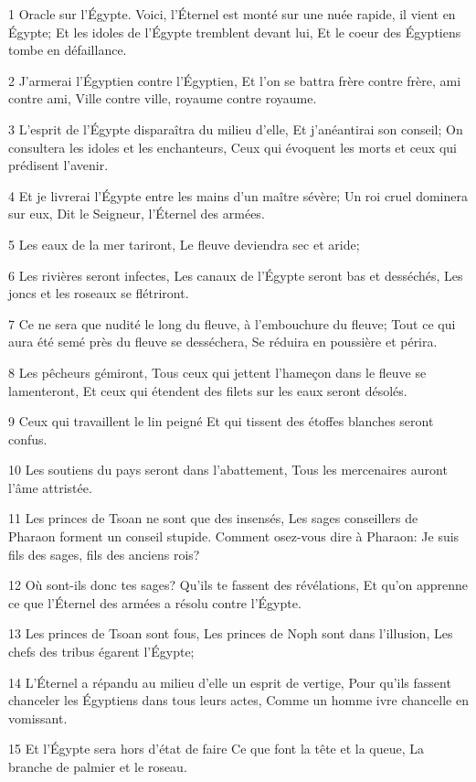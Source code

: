 \par 1 Oracle sur l'Égypte. Voici, l'Éternel est monté sur une nuée rapide, il vient en Égypte; Et les idoles de l'Égypte tremblent devant lui, Et le coeur des Égyptiens tombe en défaillance.
\par 2 J'armerai l'Égyptien contre l'Égyptien, Et l'on se battra frère contre frère, ami contre ami, Ville contre ville, royaume contre royaume.
\par 3 L'esprit de l'Égypte disparaîtra du milieu d'elle, Et j'anéantirai son conseil; On consultera les idoles et les enchanteurs, Ceux qui évoquent les morts et ceux qui prédisent l'avenir.
\par 4 Et je livrerai l'Égypte entre les mains d'un maître sévère; Un roi cruel dominera sur eux, Dit le Seigneur, l'Éternel des armées.
\par 5 Les eaux de la mer tariront, Le fleuve deviendra sec et aride;
\par 6 Les rivières seront infectes, Les canaux de l'Égypte seront bas et desséchés, Les joncs et les roseaux se flétriront.
\par 7 Ce ne sera que nudité le long du fleuve, à l'embouchure du fleuve; Tout ce qui aura été semé près du fleuve se desséchera, Se réduira en poussière et périra.
\par 8 Les pêcheurs gémiront, Tous ceux qui jettent l'hameçon dans le fleuve se lamenteront, Et ceux qui étendent des filets sur les eaux seront désolés.
\par 9 Ceux qui travaillent le lin peigné Et qui tissent des étoffes blanches seront confus.
\par 10 Les soutiens du pays seront dans l'abattement, Tous les mercenaires auront l'âme attristée.
\par 11 Les princes de Tsoan ne sont que des insensés, Les sages conseillers de Pharaon forment un conseil stupide. Comment osez-vous dire à Pharaon: Je suis fils des sages, fils des anciens rois?
\par 12 Où sont-ils donc tes sages? Qu'ils te fassent des révélations, Et qu'on apprenne ce que l'Éternel des armées a résolu contre l'Égypte.
\par 13 Les princes de Tsoan sont fous, Les princes de Noph sont dans l'illusion, Les chefs des tribus égarent l'Égypte;
\par 14 L'Éternel a répandu au milieu d'elle un esprit de vertige, Pour qu'ils fassent chanceler les Égyptiens dans tous leurs actes, Comme un homme ivre chancelle en vomissant.
\par 15 Et l'Égypte sera hors d'état de faire Ce que font la tête et la queue, La branche de palmier et le roseau.
